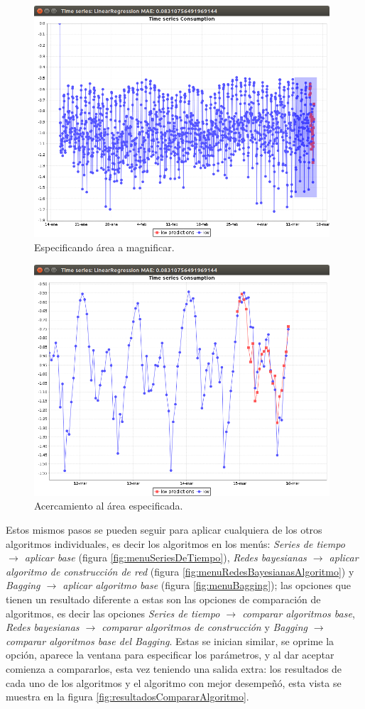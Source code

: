 \begin{figure}[h]
	\centering
	\includegraphics[width=11cm]{img/haciendoZoom.png}
	\caption{Especificando área a magnificar.}
	\label{fig:haciendoZoom}
\end{figure}
\begin{figure}[h]
	\centering
	\includegraphics[width=11cm]{img/zoom.png}
	\caption{Acercamiento al área especificada.}
	\label{fig:zoom}
\end{figure}

\clearpage
Estos mismos pasos se pueden seguir para aplicar cualquiera de los otros algoritmos individuales, es decir los algoritmos en los menús:  \textit{Series de tiempo $\rightarrow$ aplicar base} (figura \ref{fig:menuSeriesDeTiempo}), \textit{Redes bayesianas $\rightarrow$ aplicar algoritmo de construcción de red} (figura \ref{fig:menuRedesBayesianasAlgoritmo}) y  \textit{Bagging $\rightarrow$ aplicar algoritmo base} (figura \ref{fig:menuBagging}); las opciones que tienen un resultado diferente a estas son las opciones de comparación de algoritmos, es decir las opciones \textit{Series de tiempo $\rightarrow$ comparar algoritmos base}, \textit{Redes bayesianas $\rightarrow$ comparar algoritmos de construcción} y \textit{Bagging $\rightarrow$ comparar algoritmos base del Bagging}. Estas se inician similar, se oprime la opción, aparece la ventana para especificar los parámetros, y al dar aceptar comienza a compararlos, esta vez teniendo una salida extra: los resultados de cada uno de los algoritmos y el algoritmo con mejor desempeñó, esta vista se muestra en la figura \ref{fig:resultadosCompararAlgoritmo}.

